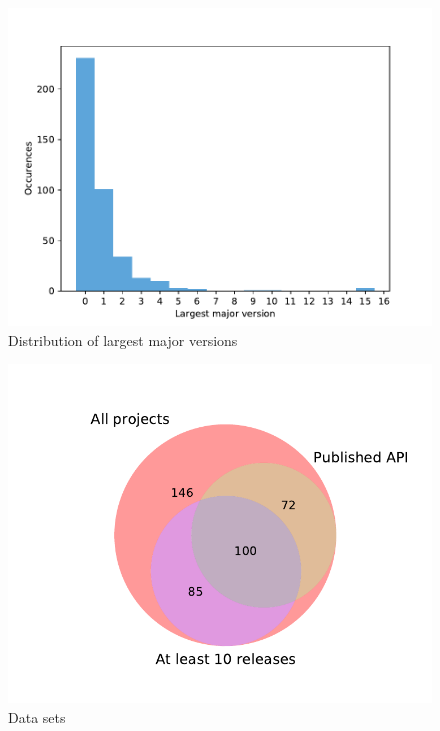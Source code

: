 \documentclass{l4proj}
\begin{document}
\begin{appendices}
\begin{figure}[]
\caption{Distribution of largest major versions}
\label{DistributionLargestMajor}
\centering
\includegraphics[height=0.4\textheight]{images/evaluation/distribution_major_versions}
\end{figure}

\begin{figure}[]
\centering
\caption{Data sets}
\label{Datasets}
\includegraphics[height=0.4\textheight]{images/evaluation/datasets}
\end{figure}


\end{appendices}
\end{document}
